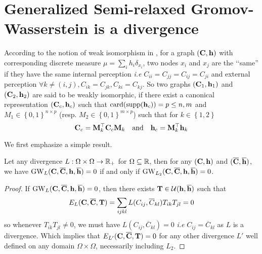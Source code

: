 \section{Generalized Semi-relaxed Gromov-Wasserstein is a divergence}\label{sec:srGW_divergence_supp}
\begin{remark}
	According to the notion of weak isomorphism in \citep{chowdhury2019gromov}, for a graph $({\mathbf{C}}, {\mathbf{h}})$ with corresponding discrete measure $\mu = \sum_i h_i \delta_{x_i}$, two nodes $x_i$ and $x_j$ are the ‘‘same'' if they have the same internal perception \emph{i.e} $C_{ii} = C_{jj} = C_{ij} = C_{ji}$ and external perception  $\forall k \neq (i, j), C_{ik} = C_{jk},  C_{ki} = C_{kj}$. So two graphs $({\mathbf{C}}_1, {\mathbf{h}}_1)$ and $({\mathbf{C}}_2, {\mathbf{h}}_2)$ are said to be weakly isomorphic, if there exist a canonical representation $({\mathbf{C}}_c, {\mathbf{h}}_c)$ such that $\operatorname{card}(\operatorname{supp}({\mathbf{h}}_c)) = p \leq n, m$ and $M_1 \in \left\{0,1 \right\}^{n \times p}$ (resp. $M_2 \in \left\{0,1 \right\}^{m \times p}$) such that for $k \in \left\{1, 2\right\}$
	\begin{equation}
		{\mathbf{C}}_c = {\mathbf{M}}_k^\top {\mathbf{C}}_c {\mathbf{M}}_k \quad \text{and} \quad {\mathbf{h}}_c = {\mathbf{M}}_k^\top {\mathbf{h}}_k
	\end{equation}
\end{remark}
We first emphasize a simple result.
\begin{proposition}\label{prop:GW_divergence}
	Let any divergence $L: \Omega \times \Omega \rightarrow \mathbb{R}_+$ for $\Omega \subseteq \mathbb{R}$, then for any $({\mathbf{C}}, {\mathbf{h}})$ and $(\overline{{\mathbf{C}}}, \overline{{\mathbf{h}}})$, we have $\operatorname{GW}_L({\mathbf{C}}, \overline{{\mathbf{C}}}, {\mathbf{h}}, \overline{{\mathbf{h}}}) = 0$ if and only if $\operatorname{GW}_{L_2}({\mathbf{C}}, \overline{{\mathbf{C}}}, {\mathbf{h}}, \overline{{\mathbf{h}}}) = 0$. 
\end{proposition}
\begin{proof}
	If $\operatorname{GW}_L({\mathbf{C}}, \overline{{\mathbf{C}}}, {\mathbf{h}}, \overline{{\mathbf{h}}}) = 0$, then there exists ${\mathbf{T}} \in \mathcal{U}({\mathbf{h}}, \overline{{\mathbf{h}}})$ such that 
	\begin{equation}
		E_L({\mathbf{C}}, \overline{{\mathbf{C}}}, {\mathbf{T}}) = \sum_{ijkl} L(C_{ij}, \overline{C}_{kl})T_{ik}T_{jl} = 0
	\end{equation}
	so whenever $T_{ik}T_{jl} \neq 0$, we must have $L(C_{ij}, \overline{C}_{kl}) = 0$ \emph{i.e} $C_{ij}= \overline{C}_{kl}$ as $L$ is a divergence. Which implies that $E_{L'}({\mathbf{C}}, \overline{{\mathbf{C}}}, {\mathbf{T}}) = 0$ for any other divergence $L'$ well defined on any domain $\Omega \times \Omega$, necessarily including $L_2$.
\end{proof}

